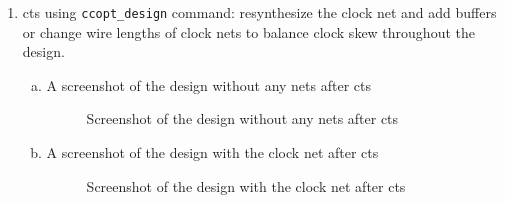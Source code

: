 \documentclass[a4paper,11pt]{article}%
\begin{document}
\begin{enumerate}[1.)]
	\item \ac{cts} using {\tt ccopt\_design} command: resynthesize the clock net and add buffers or change wire lengths of clock nets to balance clock skew throughout the design.
	
	\begin{enumerate}[a.]
		\item A screenshot of the design without any nets after \ac{cts}
		\begin{figure}[H]
			\centering
			\caption{Screenshot of the design without any nets after \ac{cts}}
		\end{figure}
		
		\item A screenshot of the design with the clock net	after \ac{cts}	
		\begin{figure}[H]
			\centering
			\caption{Screenshot of the design with the clock net after \ac{cts}}
		\end{figure}
	\end{enumerate}
	

\end{enumerate}
\end{document}
